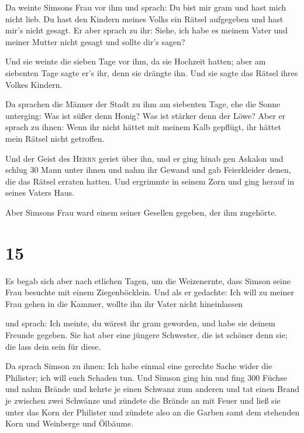  Da weinte Simsons Frau vor ihm und sprach: Du bist mir
gram und hast mich nicht lieb. Du hast den Kindern meines Volks ein
Rätsel aufgegeben und hast mir's nicht gesagt. Er aber sprach zu ihr:
Siehe, ich habe es meinem Vater und meiner Mutter nicht gesagt und
sollte dir's sagen?

 Und sie weinte die sieben Tage vor ihm, da sie Hochzeit
hatten; aber am siebenten Tage sagte er's ihr, denn sie drängte ihn. Und
sie sagte das Rätsel ihres Volkes Kindern.

 Da sprachen die Männer der Stadt zu ihm am siebenten
Tage, ehe die Sonne unterging: Was ist süßer denn Honig? Was ist stärker
denn der Löwe? Aber er sprach zu ihnen: Wenn ihr nicht hättet mit meinem
Kalb gepflügt, ihr hättet mein Rätsel nicht getroffen.

 Und der Geist des \textsc{Herrn} geriet über ihn, und er
ging hinab gen Askalon und schlug 30 Mann unter ihnen und nahm ihr
Gewand und gab Feierkleider denen, die das Rätsel erraten hatten. Und
ergrimmte in seinem Zorn und ging herauf in seines Vaters Haus.

 Aber Simsons Frau ward einem seiner Gesellen gegeben,
der ihm zugehörte.

\hypertarget{section-14}{%
\section{15}\label{section-14}}

 Es begab sich aber nach etlichen Tagen, um die
Weizenernte, dass Simson seine Frau besuchte mit einem Ziegenböcklein.
Und als er gedachte: Ich will zu meiner Frau gehen in die Kammer, wollte
ihn ihr Vater nicht hineinlassen

 und sprach: Ich meinte, du wärest ihr gram geworden, und
habe sie deinem Freunde gegeben. Sie hat aber eine jüngere Schwester,
die ist schöner denn sie; die lass dein sein für diese.

 Da sprach Simson zu ihnen: Ich habe einmal eine gerechte
Sache wider die Philister; ich will euch Schaden tun.  Und
Simson ging hin und fing 300 Füchse und nahm Brände und kehrte je einen
Schwanz zum anderen und tat einen Brand je zwischen zwei Schwänze
 und zündete die Brände an mit Feuer und ließ sie unter
das Korn der Philister und zündete also an die Garben samt dem stehenden
Korn und Weinberge und Ölbäume.

